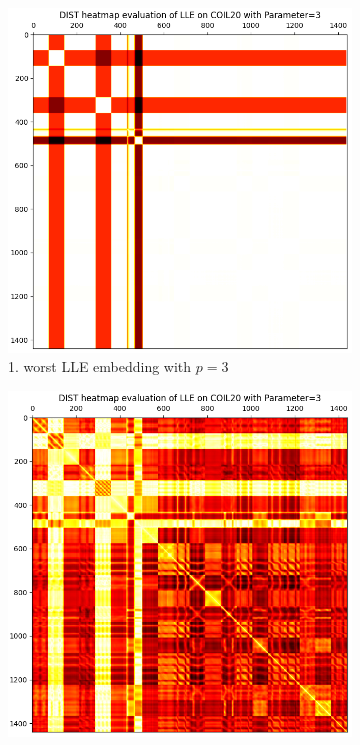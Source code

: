\begin{figure}[!]
     \centering
     \begin{subfigure}[t]{0.49\columnwidth}
    	\centering
    	\includegraphics[width=\columnwidth]{images/dist_heatmap_lle_coil20_1worst_beforediff.png}
    	\caption{1. worst LLE embedding with $p=3$}
        \label{fig:dist_heatmap_lle_coil20_1worst_beforediff}
    \end{subfigure}
     \hfill
     \begin{subfigure}[t]{0.49\columnwidth}
    	\centering
    	\includegraphics[width=\columnwidth]{images/dist_heatmap_lle_coil20_1worst.png}

\end{subfigure}
\end{figure}
